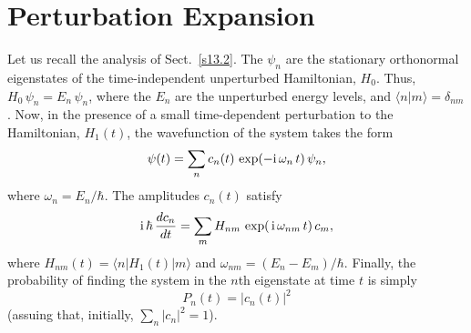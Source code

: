 \section{Perturbation Expansion}
Let us recall the analysis of Sect.~\ref{s13.2}. The $\psi_n$
are the stationary orthonormal eigenstates of the time-independent
unperturbed Hamiltonian, $H_0$. Thus, $H_0\,\psi_n=E_n\,\psi_n$,
where the $E_n$ are the unperturbed energy levels, and $\langle n|m\rangle=\delta_{nm}$. Now, in the presence of a small
time-dependent perturbation to the Hamiltonian, $H_1(t)$, the wavefunction
of the system takes the form
\begin{equation}
\psi(t)= \sum_n c_n(t)\,\exp(-{\rm i}\,\omega_n\,t)\,\psi_n,
\end{equation}
where $\omega_n=E_n/\hbar$. The amplitudes $c_n(t)$ satisfy
\begin{equation}\label{e13.42}
{\rm i}\,\hbar\,\frac{d c_n}{dt} = \sum_m H_{nm}\,\exp(\,{\rm i}\,\omega_{nm}\,t)\,c_m,
\end{equation}
where $H_{nm}(t)=\langle n|H_1(t)|m\rangle$ and $\omega_{nm}=(E_n-E_m)/\hbar$. Finally, the probability of finding the system in the $n$th eigenstate
at time $t$ is simply
\begin{equation}
P_n(t)= |c_n(t)|^2
\end{equation}
(assuing that, initially, $\sum_n|c_n|^2=1$).

